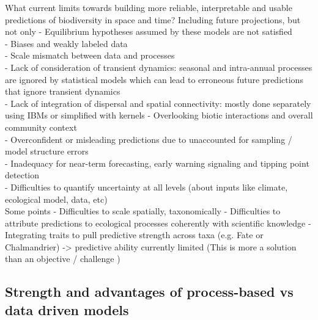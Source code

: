 What current limits towards building more reliable, interpretable and usable predictions of biodiversity in space and time? Including future projections, but not only 
- Equilibrium hypotheses assumed by these models are not satisfied \\
- Biases and weakly labeled data \\
- Scale mismatch between data and processes  \\
- Lack of consideration of transient dynamics: seasonal and intra-annual processes are ignored by statistical models which can lead to erroneous future predictions that ignore transient dynamics  \\
- Lack of integration of dispersal and spatial connectivity: mostly done separately using IBMs or simplified with kernels 
- Overlooking biotic interactions and overall community context  \\
- Overconfident or misleading predictions due to unaccounted for sampling / model structure errors  \\
- Inadequacy for near-term forecasting, early warning signaling and tipping point detection  \\
- Difficulties to quantify uncertainty at all levels (about inputs like climate, ecological model, data, etc)  \\

Some points
- Difficulties to scale spatially, taxonomically
- Difficulties to attribute predictions to ecological processes coherently with scientific knowledge
- Integrating traits to pull predictive strength across taxa (e.g. Fate or Chalmandrier) -> predictive ability currently limited  (This is more a solution than an objective / challenge )


\subsection{Strength and advantages of process-based vs data driven models} %

